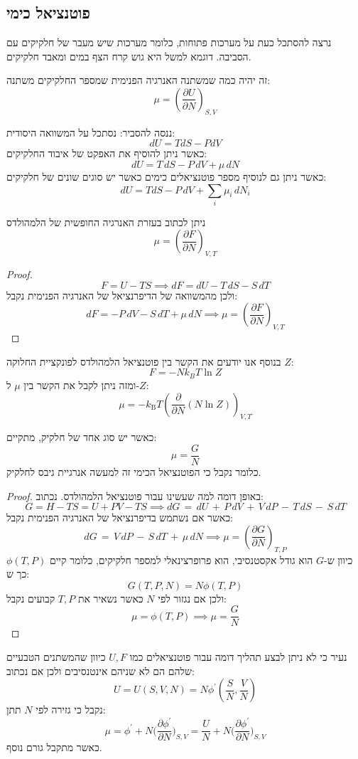 \documentclass{tstextbook}
\begin{document}
\subsection{פוטנציאל כימי}

נרצה להסתכל כעת על מערכות פתוחות, כלומר מערכות שיש מעבר של חלקיקים עם הסביבה. דוגמא למשל היא גוש קרח הצף במים ומאבד חלקיקים.

\begin{definition}
זה יהיה כמה שמשתנה האנרגיה הפנימית שמספר החלקיקים משתנה:
$$\mu\!=\!\left({\frac{\partial U}{\partial N}}\right)_{S,V}$$

\end{definition}
ננסה להסביר:
נסתכל על המשוואה היסודית:
$$d U=T d S-P d V$$
כאשר ניתן להוסיף את האפקט של איבוד החלקיקים:
$$d U=T\,d S-P\,d V+\mu\,d N$$
כאשר ניתן גם לנוסיף מספר פוטנציאלים כימים כאשר יש סוגים שונים של חלקיקים:
$$d U=T d S-P\,d V+\sum_{i}\mu_{i}\,d N_{i}$$

\begin{proposition}
ניתן לכתוב בעזרת האנרגיה החופשית של הלמהולדס
$$\mu=\left({\frac{\partial F}{\partial N}}\right)_{V,T}$$

\end{proposition}
\begin{proof}
$${F=U-T S}\implies d F=d U-T\,d S-S\,d T$$
ולכן מהמשוואה של הדיפרנציאל של האנרגיה הפנימית נקבל:
$$d F=-P\,d V-S\,d T+\mu\,d N\implies \mu=\left({\frac{\partial F}{\partial N}}\right)_{V,T}$$

\end{proof}
בנוסף אנו יודעים את הקשר בין פוטנציאל הלמהולדס לפונקציית החלוקה \(Z\):
$$F=-N k_{B}T\ln Z$$
ומזה ניתן לקבל את הקשר בין \(\mu\) ל-\(Z\):
$$\mu=-k_{\mathrm{{B}}}T\left({\frac{\partial}{\partial N}}(N\ln Z)\right)_{V,T}$$

\begin{proposition}
כאשר יש סוג אחד של חלקיק, מתקיים:
$$\mu=\frac{G}{N}$$
כלומר נקבל כי הפוטנציאל הכימי זה למעשה אנרגיית גיבס לחלקיק.

\end{proposition}
\begin{proof}
באופן דומה למה שעשינו עבור פוטנציאל הלמהולדס. נכתוב:
$$G=H-T S=U+P V-T S\implies  d G\,=\,d U\,+\,P\,d V\,+\,V\,d P\,-\,T\,d S\,-\,S\,d T$$
כאשר אם נשתמש בדיפרנציאל של האנרגיה הפנימית נקבל:
$$d G\,=\,V\,d P\,-\,S\,d T\,+\,\mu\,d N\implies \mu=\left({\frac{\partial G}{\partial N}}\right)_{T,P}$$
כיוון ש-\(G\) הוא גודל אקסטנסיבי, הוא פרופרצינאלי למספר חלקיקים, כלומר קיים \(\phi(T,P)\) כך ש:
$$G(T,P,N)\!=\!N\phi(T,P)$$
ולכן אם נגזור לפי \(N\) כאשר נשאיר את \(T,P\) קבועים נקבל:
$$\mu=\phi(T,P)\implies \mu=\frac{G}{N}$$

\end{proof}
נעיר כי לא ניתן לבצע תהליך דומה עבור פוטנציאלים כמו \(U,F\) כיוון שהמשתנים הטבעיים שלהם הם לא שניהם אינטנסיבים ולכן אם נכתוב:
$$U\!=\!U\!(S,V,N)\!=\!N\phi^{\prime}\!\left({\frac{S}{N}},{\frac{V}{N}}\right)$$
נקבל כי גזירה לפי \(N\) תתן:
$$\mu=\phi^{\prime}+N\Biggl(\frac{\partial\phi^{\prime}}{\partial N}\Biggr)_{S,V}=\frac{U}{N}+N\Biggl(\frac{\partial\phi^{\prime}}{\partial N}\Biggr)_{S,V}$$
כאשר מתקבל גורם נוסף.
\end{document}
